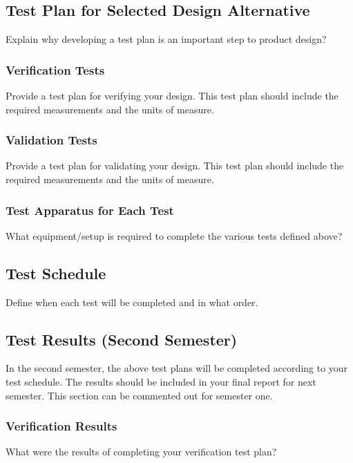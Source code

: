 \documentclass{other/docTemplate}
\begin{document}
\subsection{Test Plan for Selected Design Alternative}
Explain why developing a test plan is an important step to product design? 



\subsubsection{Verification Tests}
Provide a test plan for verifying your design.
This test plan should include the required measurements and the units of measure.

\subsubsection{Validation Tests}
Provide a test plan for validating your design.
This test plan should include the required measurements and the units of measure.

\subsubsection{Test Apparatus for Each Test}
What equipment/setup is required to complete the various tests defined above? 


\subsection{Test Schedule}
Define when each test will be completed and in what order.


\subsection{Test Results (Second Semester)}
In the second semester, the above test plans will be completed according to your test schedule. The results should be included in your final report for next semester. This section can be commented out for semester one. 
\subsubsection{Verification Results}
What were the results of completing your verification test plan?
\end{document}
